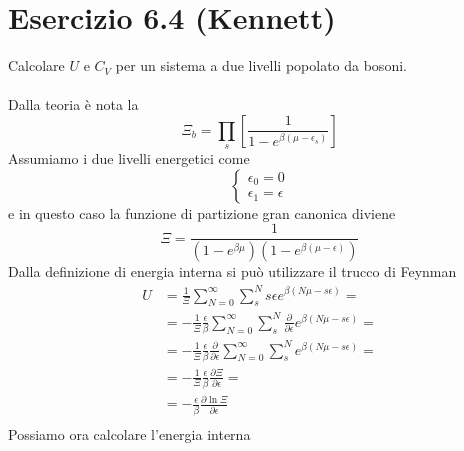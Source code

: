 \documentclass[a4paper]{article}
\begin{document}
    \section*{Esercizio 6.4 (Kennett)}
        Calcolare $U$ e $C_V$ per un sistema a due livelli popolato da bosoni.
        \\
        \\
        Dalla teoria è nota la
        \begin{equation*}
            \Xi_b=\prod_s\left[\frac{1}{1-e^{\beta(\mu-\epsilon_s)}}\right]
        \end{equation*}
        Assumiamo i due livelli energetici come
        \begin{equation*}
            \begin{cases}
                \epsilon_0=0\\
                \epsilon_1=\epsilon
            \end{cases}
        \end{equation*}
        e in questo caso la funzione di partizione gran canonica diviene
        \begin{equation*}
            \Xi=\frac{1}{(1-e^{\beta\mu})(1-e^{\beta(\mu-\epsilon)})}
        \end{equation*}
        Dalla definizione di energia interna si può utilizzare il trucco di Feynman
        \begin{equation*}
            \begin{split}
                U&=\frac{1}{\Xi}\sum_{N=0}^\infty\sum_{s}^Ns\epsilon e^{\beta(N\mu-s\epsilon)}=\\
                &=-\frac{1}{\Xi}\frac{\epsilon}{\beta}\sum_{N=0}^\infty\sum_{s}^N\frac{\partial}{\partial\epsilon}e^{\beta(N\mu-s\epsilon)}=\\
                &=-\frac{1}{\Xi}\frac{\epsilon}{\beta}\frac{\partial}{\partial\epsilon}\sum_{N=0}^\infty\sum_{s}^Ne^{\beta(N\mu-s\epsilon)}=\\
                &=-\frac{1}{\Xi}\frac{\epsilon}{\beta}\frac{\partial\Xi}{\partial\epsilon}=\\
                &=-\frac{\epsilon}{\beta}\frac{\partial\ln\Xi}{\partial\epsilon}\\
            \end{split}
        \end{equation*}
        Possiamo ora calcolare l'energia interna
\end{document}
